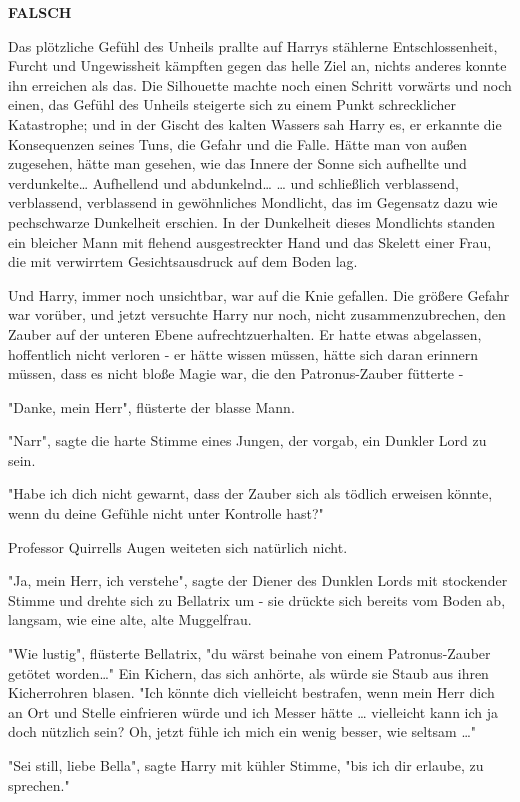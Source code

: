 {\textbf{FALSCH}

Das plötzliche Gefühl des Unheils prallte auf Harrys stählerne Entschlossenheit, Furcht und Ungewissheit kämpften gegen das helle Ziel an, nichts anderes konnte ihn erreichen als das. Die Silhouette machte noch einen Schritt vorwärts und noch einen, das Gefühl des Unheils steigerte sich zu einem Punkt schrecklicher Katastrophe; und in der Gischt des kalten Wassers sah Harry es, er erkannte die Konsequenzen seines Tuns, die Gefahr und die Falle. Hätte man von außen zugesehen, hätte man gesehen, wie das Innere der Sonne sich aufhellte und verdunkelte… Aufhellend und abdunkelnd… … und schließlich verblassend, verblassend, verblassend in gewöhnliches Mondlicht, das im Gegensatz dazu wie pechschwarze Dunkelheit erschien. In der Dunkelheit dieses Mondlichts standen ein bleicher Mann mit flehend ausgestreckter Hand und das Skelett einer Frau, die mit verwirrtem Gesichtsausdruck auf dem Boden lag.

Und Harry, immer noch unsichtbar, war auf die Knie gefallen. Die größere Gefahr war vorüber, und jetzt versuchte Harry nur noch, nicht zusammenzubrechen, den Zauber auf der unteren Ebene aufrechtzuerhalten. Er hatte etwas abgelassen, hoffentlich nicht verloren - er hätte wissen müssen, hätte sich daran erinnern müssen, dass es nicht bloße Magie war, die den Patronus-Zauber fütterte -

"Danke, mein Herr", flüsterte der blasse Mann.

"Narr", sagte die harte Stimme eines Jungen, der vorgab, ein Dunkler Lord zu sein.

"Habe ich dich nicht gewarnt, dass der Zauber sich als tödlich erweisen könnte, wenn du deine Gefühle nicht unter Kontrolle hast?"

Professor Quirrells Augen weiteten sich natürlich nicht.

"Ja, mein Herr, ich verstehe", sagte der Diener des Dunklen Lords mit stockender Stimme und drehte sich zu Bellatrix um - sie drückte sich bereits vom Boden ab, langsam, wie eine alte, alte Muggelfrau.

"Wie lustig", flüsterte Bellatrix, "du wärst beinahe von einem Patronus-Zauber getötet worden…" Ein Kichern, das sich anhörte, als würde sie Staub aus ihren Kicherrohren blasen. "Ich könnte dich vielleicht bestrafen, wenn mein Herr dich an Ort und Stelle einfrieren würde und ich Messer hätte … vielleicht kann ich ja doch nützlich sein? Oh, jetzt fühle ich mich ein wenig besser, wie seltsam …"

"Sei still, liebe Bella", sagte Harry mit kühler Stimme, "bis ich dir erlaube, zu sprechen."

}

